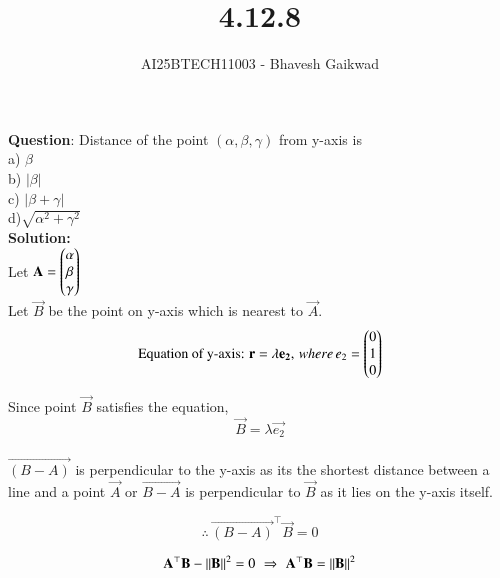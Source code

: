 \documentclass[journal]{IEEEtran}
\begin{document}

\vspace{3cm}

\title{4.12.8}
\author{AI25BTECH11003 - Bhavesh Gaikwad}
{\let\newpage\relax\maketitle}

\renewcommand{\thefigure}{\theenumi}
\renewcommand{\thetable}{\theenumi}
\setlength{\intextsep}{10pt} 


\renewcommand{\thetable}{\theenumi}


\textbf{Question}: Distance of the point $(\alpha, \beta, \gamma)$ from y-axis is\\
a) $\beta$\\
b) $|\beta|$\\
c) $|\beta + \gamma|$\\
d)$\sqrt{\alpha^2 + \gamma^2}$ \\

\textbf{Solution:}\\
Let $\mathbf{A} = \begin{pmatrix}\alpha \\ \beta \\ \gamma\end{pmatrix}$\\
Let $\vec{B}$ be the point on y-axis which is nearest to $\vec{A}$.\\


\begin{equation}
\text{Equation of y-axis: } \mathbf{r} = \lambda \mathbf{e_2}, \, where \, e_2=\begin{pmatrix}0 \\ 1 \\ 0\end{pmatrix}
\end{equation}


Since point $\vec{B}$ satisfies the equation,
\begin{equation}
    \vec{B} = \lambda \vec{e_2}
\end{equation}\\

$\vec{(B-A)}$ is perpendicular to the y-axis as its the shortest distance between a line and a point $\vec{A}$ or $\vec{B-A}$ is perpendicular to $\vec{B}$ as it lies on the y-axis itself.

\begin{equation}
    \therefore \, \vec{(B-A)}^\top\vec{B} = 0
\end{equation}

\begin{equation}
    \mathbf{A}^\top\mathbf{B} - \left\lVert\mathbf{B}\right\rVert^2 = 0 \, \, \Rightarrow \, \,
    \mathbf{A}^\top\mathbf{B} = \left\lVert\mathbf{B}\right\rVert^2
\end{equation}
\end{document}
